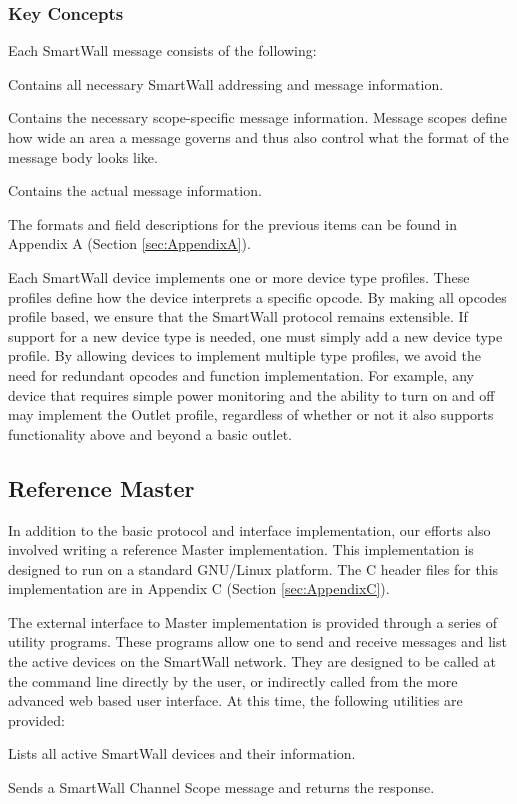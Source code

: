 \documentclass[12pt]{article}
\begin{document}
\subsubsection{Key Concepts}

Each SmartWall message consists of the following:
\begin{description}
  \setlength{\itemsep}{0pt}
  \setlength{\parskip}{0pt}
  \setlength{\parsep}{0pt}
\item[SmartWall Message Header:] Contains all necessary SmartWall
  addressing and message information.
\item[SmartWall Scope Header:] Contains the necessary scope-specific
  message information. Message scopes define how wide an area a
  message governs and thus also control what the format of the message
  body looks like.
\item[SmartWall Message Body:] Contains the actual message information.
\end{description}

The formats and field descriptions for the previous items can be found
in Appendix A (Section \ref{sec:AppendixA}).

Each SmartWall device implements one or more device
type profiles. These profiles define how the device interprets a
specific opcode. By making all opcodes profile based, we ensure that
the SmartWall protocol remains extensible. If support for a new device
type is needed, one must simply add a new device type profile. By
allowing devices to implement multiple type profiles, we avoid the need
for redundant opcodes and function implementation. For example, any
device that requires simple power monitoring and the ability to turn
on and off may implement the Outlet profile, regardless of whether or not
it also supports functionality above and beyond a basic outlet.

\subsection{Reference Master}
\label{sec:Implementaion.ReferenceMaster}
In addition to the basic protocol and interface implementation, our
efforts also involved writing a reference Master implementation. This
implementation is designed to run on a standard GNU/Linux
platform. The C header files for this implementation are in Appendix C
(Section \ref{sec:AppendixC}).

The external interface to Master implementation is provided through a
series of utility programs. These programs allow one to send and
receive messages and list the active devices on the SmartWall
network. They are designed to be called at the command line directly by
the user, or indirectly called from the more advanced web based user
interface. At this time, the following utilities are provided:
\begin{description}
  \setlength{\itemsep}{0pt}
  \setlength{\parskip}{0pt}
  \setlength{\parsep}{0pt}
\item[swls:] Lists all active SmartWall devices and their information.  
\item[swChnMsg:] Sends a SmartWall Channel Scope message and returns
  the response.
\end{description}
\end{document}
